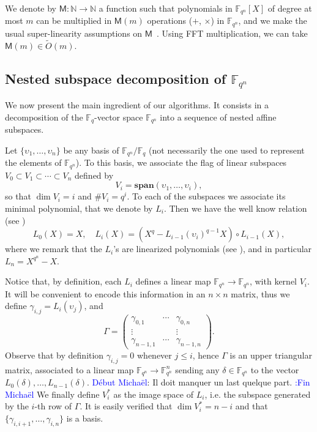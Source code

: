 \documentclass{sig-alternate}
\newcommand{\ff}[1]{\mathbb{F}_{#1}}
\newcommand{\fq}{\ff{q}}
\newcommand{\fqn}{\ff{q^n}}
\newcommand{\qq}{q}
\newcommand{\nn}{n}
\newcommand{\qn}{{\qq^\nn}}
\newcommand{\basef}{\ff{\qq}}
\newcommand{\extf}{\ff{\qn}}
\newcommand{\bigOt}{\tilde{O}}
\newcommand{\Mul}{\mathsf{M}}
\newcommand{\Span}{\mathbf{span}}
\newcommand{\card}[1]{\# #1}
\newcounter{algo}
\newcommand{\comd}{\noindent \textcolor{blue}{D\'ebut Micha\"el}:}
\newcommand{\comf}{\noindent \textcolor{blue}{:Fin Micha\"el}}
\renewcommand{\paragraph}[1]{\smallskip\noindent{{\bf \rm #1.}}}
\begin{document}
We denote by $\Mul : \mathbb{N} \to \mathbb{N}$ a function such that
polynomials in $\extf[X]$ of degree at most $m$ can be multiplied in
$\Mul(m)$ operations ($+$, $\times$) in $\extf$, and we make the
usual super-linearity assumptions on
$\Mul$~\cite[Chapter~8]{Gathen2003}.  Using FFT multiplication, we can
take $\Mul(m)\in\bigOt(m)$.


\subsection{Nested subspace decomposition of $\extf$}
\label{sec:nsd}

We now present the main ingredient of our algorithms. It consists in a
decomposition of the $\basef$-vector space $\extf$ into a sequence of
nested affine subspaces.

\paragraph{Approximating $\extf$ by a flag} Let
$\{\upsilon_1,\ldots,\upsilon_\nn\}$ be any basis of $\fqn/\fq$ (not
necessarily the one used to represent the elements of $\extf$). To
this basis, we associate the flag of linear subspaces $V_0\subset
V_1\subset \cdots \subset V_\nn$ defined by
\begin{equation}
  V_i = \Span(\upsilon_1,\dots,\upsilon_i),
\end{equation}
so that $\dim V_i = i$ and $\card V_i = \qq^i$. To each of the
subspaces we associate its minimal polynomial, that we denote by
$L_i$. Then we have the well know relation (see
\cite[Lemma~1]{cgUCL-P14})
\begin{equation}
  L_0(X) = X, \quad L_i(X) = (X^\qq - L_{i-1}(\upsilon_i)^{\qq-1}X)\circ L_{i-1}(X),
\end{equation}
where we remark that the $L_i$'s are linearized polynomials (see
\cite[Ch. 11]{Berlekamp1984}), and in particular $L_\nn=X^\qn-X$.

Notice that, by definition, each $L_i$ defines a linear map
$\extf\to\extf$, with kernel $V_i$. It will be convenient to encode
this information in an $\nn\times\nn$ matrix, thus we define
$\gamma_{i,j}=L_i(\upsilon_j)$, and
\begin{equation}
  \label{eq:Gamma}
  \Gamma =
  \begin{pmatrix}
    \gamma_{0,1} & \cdots & \gamma_{0,\nn}\\
    \vdots & & \vdots\\
    \gamma_{\nn-1,1} & \cdots & \gamma_{\nn-1,\nn}
  \end{pmatrix}.
\end{equation}
Observe that by definition $\gamma_{i,j}=0$ whenever $j\le i$, hence
$\Gamma$ is an upper triangular matrix, associated to a linear map
$\extf\to\extf^\nn$ sending any $\delta\in\extf$ to the vector
$L_0(\delta),\dots,L_{n-1}(\delta)$.  
\comd
 Il doit manquer un last quelque part.
\comf
We finally define $V_i^\ast$ as
the image space of $L_i$, i.e. the subspace generated by the $i$-th
row of $\Gamma$.  It is easily verified that $\dim V_i^\ast=n-i$ and
that $\{\gamma_{i,i+1},\dots,\gamma_{i,\nn}\}$ is a basis.
\end{document}
